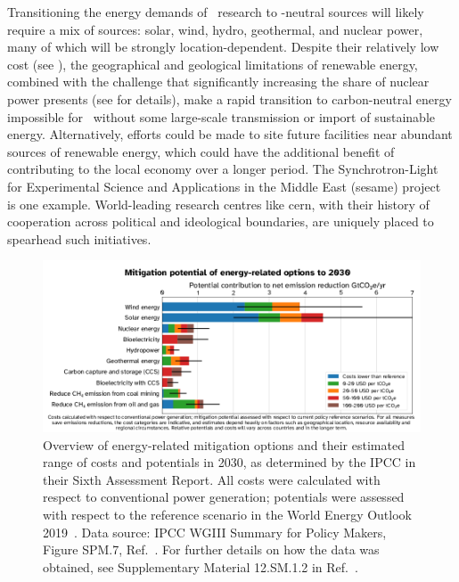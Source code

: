 \documentclass[../SustainableHEP.tex]{subfiles}
\begin{document}
Transitioning the energy demands of \ACR\ research to \CdO-neutral sources will likely require a mix of sources: solar, wind, hydro, geothermal, and nuclear power, many of which will be strongly location-dependent. Despite their relatively low cost (see ), the
geographical and geological limitations of renewable energy, combined with the challenge that significantly increasing the share of nuclear power presents (see  for details), make a rapid transition to carbon-neutral energy impossible for \ACR\ without some large-scale transmission or import of sustainable energy. Alternatively, efforts could be made to site future facilities near abundant sources of renewable energy, which could have the additional benefit of contributing to the local economy over a longer period. The Synchrotron-Light for
Experimental Science and Applications in the Middle East (\acrshort{sesame}) project ~\cite{Sesame} is one example.  World-leading research centres like \acrshort{cern},  with their history of cooperation across political and ideological boundaries, are uniquely placed to spearhead such initiatives.  

\begin{figure}[!tb]
     \centering
     \includegraphics[width=0.99\linewidth]{Sections/Figs/Energy/IPCCMitigationPotential.png}
     \caption[IPCC 
    mitigation potential for alternative sources of energy]{Overview of energy-related mitigation options and their estimated range of costs and potentials in 2030, as determined by the IPCC in their Sixth Assessment Report. All costs were calculated with respect to conventional power generation; potentials were assessed with respect to the reference scenario in the World Energy Outlook 2019~\cite{IEA2019}.  Data source: IPCC WGIII Summary for Policy Makers, Figure SPM.7, Ref.~\cite{IPCCMitigationData}.  For further details on how the data was obtained, see Supplementary Material 12.SM.1.2 in Ref.~\cite{IPCCMitigationReport}.}
     \label{fig:ene-mitigation}
 \end{figure}
\end{document}
